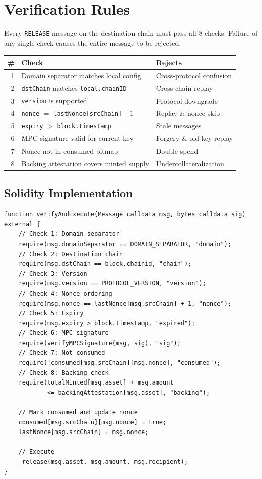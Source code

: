 \section{Verification Rules}


Every \texttt{RELEASE} message on the destination chain must pass all 8 checks. Failure of any single check causes the entire message to be rejected.

\begin{center}
\begin{tabular}{rll}
\toprule
\textbf{\#} & \textbf{Check} & \textbf{Rejects} \\
\midrule
1 & Domain separator matches local config & Cross-protocol confusion \\
2 & \texttt{dstChain} matches \texttt{local.chainID} & Cross-chain replay \\
3 & \texttt{version} is supported & Protocol downgrade \\
4 & \texttt{nonce} $=$ \texttt{lastNonce[srcChain]} $+ 1$ & Replay \& nonce skip \\
5 & \texttt{expiry} $>$ \texttt{block.timestamp} & Stale messages \\
6 & MPC signature valid for current key & Forgery \& old key replay \\
7 & Nonce not in consumed bitmap & Double spend \\
8 & Backing attestation covers minted supply & Undercollateralization \\
\bottomrule
\end{tabular}
\end{center}

\subsection{Solidity Implementation}

\begin{lstlisting}[language=Solidity,caption={Verification function (simplified)}]
function verifyAndExecute(Message calldata msg, bytes calldata sig) external {
    // Check 1: Domain separator
    require(msg.domainSeparator == DOMAIN_SEPARATOR, "domain");
    // Check 2: Destination chain
    require(msg.dstChain == block.chainid, "chain");
    // Check 3: Version
    require(msg.version == PROTOCOL_VERSION, "version");
    // Check 4: Nonce ordering
    require(msg.nonce == lastNonce[msg.srcChain] + 1, "nonce");
    // Check 5: Expiry
    require(msg.expiry > block.timestamp, "expired");
    // Check 6: MPC signature
    require(verifyMPCSignature(msg, sig), "sig");
    // Check 7: Not consumed
    require(!consumed[msg.srcChain][msg.nonce], "consumed");
    // Check 8: Backing check
    require(totalMinted[msg.asset] + msg.amount
            <= backingAttestation[msg.asset], "backing");

    // Mark consumed and update nonce
    consumed[msg.srcChain][msg.nonce] = true;
    lastNonce[msg.srcChain] = msg.nonce;

    // Execute
    _release(msg.asset, msg.amount, msg.recipient);
}
\end{lstlisting}

